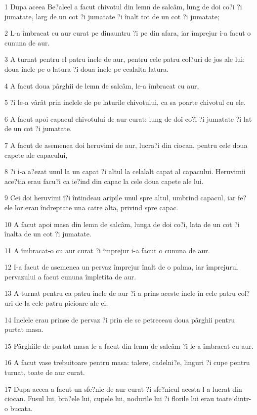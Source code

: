 \par 1 Dupa aceea Be?aleel a facut chivotul din lemn de salcâm, lung de doi co?i ?i jumatate, larg de un cot ?i jumatate ?i înalt tot de un cot ?i jumatate;
\par 2 L-a îmbracat cu aur curat pe dinauntru ?i pe din afara, iar împrejur i-a facut o cununa de aur.
\par 3 A turnat pentru el patru inele de aur, pentru cele patru col?uri de jos ale lui: doua inele pe o latura ?i doua inele pe cealalta latura.
\par 4 A facut doua pârghii de lemn de salcâm, le-a îmbracat cu aur,
\par 5 ?i le-a vârât prin inelele de pe laturile chivotului, ca sa poarte chivotul cu ele.
\par 6 A facut apoi capacul chivotului de aur curat: lung de doi co?i ?i jumatate ?i lat de un cot ?i jumatate.
\par 7 A facut de asemenea doi heruvimi de aur, lucra?i din ciocan, pentru cele doua capete ale capacului,
\par 8 ?i i-a a?ezat unul la un capat ?i altul la celalalt capat al capacului. Heruvimii ace?tia erau facu?i ca ie?ind din capac la cele doua capete ale lui.
\par 9 Cei doi heruvimi î?i întindeau aripile unul spre altul, umbrind capacul, iar fe?ele lor erau îndreptate una catre alta, privind spre capac.
\par 10 A facut apoi masa din lemn de salcâm, lunga de doi co?i, lata de un cot ?i înalta de un cot ?i jumatate.
\par 11 A îmbracat-o cu aur curat ?i împrejur i-a facut o cununa de aur.
\par 12 I-a facut de asemenea un pervaz împrejur înalt de o palma, iar împrejurul pervazului a facut cununa împletita de aur.
\par 13 A turnat pentru ea patru inele de aur ?i a prins aceste inele în cele patru col?uri de la cele patru picioare ale ei.
\par 14 Inelele erau prinse de pervaz ?i prin ele se petreceau doua pârghii pentru purtat masa.
\par 15 Pârghiile de purtat masa le-a facut din lemn de salcâm ?i le-a îmbracat cu aur.
\par 16 A facut vase trebuitoare pentru masa: talere, cadelni?e, linguri ?i cupe pentru turnat, toate de aur curat.
\par 17 Dupa aceea a facut un sfe?nic de aur curat ?i sfe?nicul acesta l-a lucrat din ciocan. Fusul lui, bra?ele lui, cupele lui, nodurile lui ?i florile lui erau toate dintr-o bucata.

